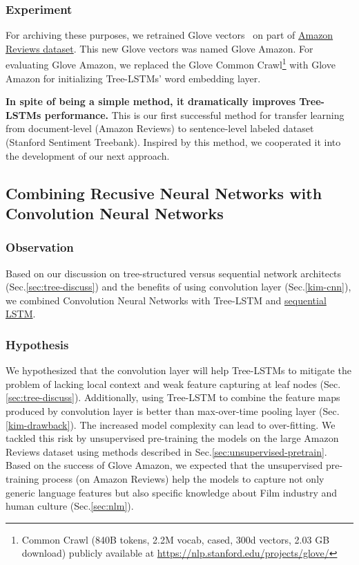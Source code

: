 \subsubsection{Experiment}
For archiving these purposes, we retrained Glove vectors~\cite{glove} on part of  \hyperref[sec:amazon]{Amazon Reviews dataset}.
This new Glove vectors was named Glove Amazon.
For evaluating Glove Amazon, we replaced the Glove Common Crawl\footnote{Common Crawl (840B tokens, 2.2M vocab, cased, 300d vectors, 2.03 GB download) publicly available at \url{https://nlp.stanford.edu/projects/glove/}} with Glove Amazon for initializing Tree-LSTMs' word embedding layer.

\textbf{In spite of being a simple method, it dramatically improves Tree-LSTMs performance.}
This is our first successful method for transfer learning from document-level (Amazon Reviews) to sentence-level labeled dataset (Stanford Sentiment Treebank).
Inspired by this method, we cooperated it into the development of our next approach.

\subsection{Combining Recusive Neural Networks with Convolution Neural Networks}

\subsubsection{Observation}
Based on our discussion on tree-structured versus sequential network architects (Sec.\ref{sec:tree-discuss}) and the benefits of using convolution layer (Sec.\ref{kim-cnn}), we combined Convolution Neural Networks with Tree-LSTM and \hyperref[sec:lstm]{sequential LSTM}.


\subsubsection{Hypothesis}
We hypothesized that the convolution layer will help Tree-LSTMs to mitigate the problem of lacking local context and weak feature capturing at leaf nodes (Sec.\ref{sec:tree-discuss}).
Additionally, using Tree-LSTM to combine the feature maps produced by convolution layer is better than max-over-time pooling layer (Sec.\ref{kim-drawback}).
The increased model complexity can lead to over-fitting.
We tackled this risk by unsupervised pre-training the models on the large Amazon Reviews dataset using methods described in Sec.\ref{sec:unsupervised-pretrain}.
Based on the success of Glove Amazon, we expected that the unsupervised pre-training process (on Amazon Reviews) help the models to capture not only generic language features but also specific knowledge about Film industry and human culture (Sec.\ref{sec:nlm}).


